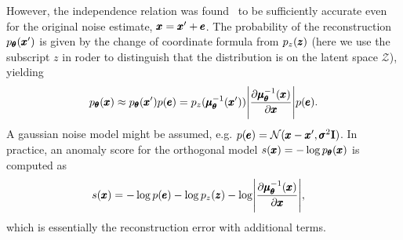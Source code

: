 However, the independence relation was found~\cite{vsmidl2019anomaly} to be sufficiently accurate even for the original noise estimate, $\pmb{{x}}=\pmb{{x}}'+\pmb{{e}}$.  The  probability of the reconstruction $p_{\pmb{{\theta}}}(\pmb{{x}}')$ is given by the change of coordinate formula from $p_{z}(\pmb{{z}})$ (here we use the subscript $z$ in roder to distinguish that the distribution is on the latent space $\mathcal{Z}$), yielding
\begin{align}
p_{\vc{\theta}}(\vc{x})\approx p_{\vc{\theta}}(\vc{x}')p(\vc{e})=p_{z}(\vc{\mu}_{\vc{\theta}}^{-1}(\vc{x}'))\left\vert \frac{\partial \vc{\mu}_{\vc{\theta}}^{-1}(\vc{x})}{\partial \vc{x}}\right\vert p(\vc{e}).\label{eq:pxjacodeco}
\end{align}
A gaussian noise model might be assumed, e.g. $p(\pmb{{e}}) = \mathcal{N}(\pmb{{x}}-\pmb{{x}}',\pmb{{\sigma}}^{2}\mathbf{I})$. In practice, an anomaly score for the orthogonal model $s(\pmb{{x}}) = - \log p_{\pmb{{\theta}}}(\pmb{{x}})$ is computed as
\begin{align}
s(\vc{x}) & = - \log p(\vc{e}) -\log p_{z}(\vc{z})-\log\left\vert \frac{\partial \vc{\mu}_{\vc{\theta}}^{-1}(\vc{x})}{\partial \vc{x}}\right\vert ,\label{eq:jacodeco}
\end{align}
which is essentially the reconstruction error with additional terms.

